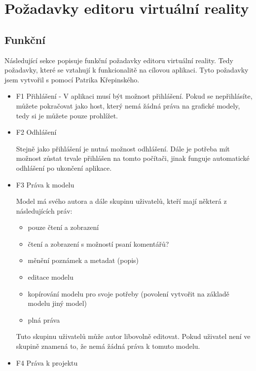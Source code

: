 \documentclass[thesis=B,czech]{FITthesis}[2012/06/26]
\begin{document}
    \section{Požadavky editoru virtuální reality}
        \subsection{Funkční} \label{sec:analFP}
            Následující sekce popisuje funkční požadavky editoru virtuální reality. Tedy požadavky, které se vztahují k funkcionalitě na cílovou aplikaci. Tyto požadavky jsem vytvořil s pomocí Patrika Křepinského.
            
            \begin{itemize}
                \item F1 Přihlášení - V aplikaci musí být možnost přihlášení. Pokud se nepřihlásíte, můžete pokračovat jako host, který nemá žádná práva na grafické modely, tedy si je můžete pouze prohlížet.
                \item F2 Odhlášení
                
                Stejně jako přihlášení je nutná možnost odhlášení. Dále je potřeba mít možnost zůstat trvale přihlášen na tomto počítači, jinak funguje automatické odhlášení po ukončení aplikace.
               \item F3 Práva k modelu
               
                Model má svého autora a dále skupinu uživatelů, kteří mají některá z následujících práv:
                \begin{itemize}
                    \item pouze čtení a zobrazení
                    \item čtení a zobrazení s možností psaní komentářů?
                    \item měnění poznámek a metadat (popis)
                    \item editace modelu
                    \item kopírování modelu pro svoje potřeby (povolení vytvořit na základě modelu jiný model)
                    \item plná práva
                \end{itemize}
                Tuto skupinu uživatelů může autor libovolně editovat. Pokud uživatel není ve skupině znamená to, že nemá žádná práva k tomuto modelu.
               \item F4 Práva k projektu
               

\end{itemize}
\end{document}
